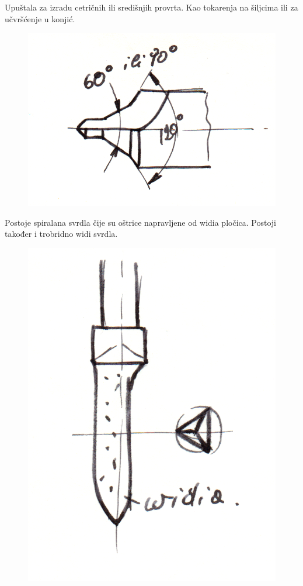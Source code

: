 \documentclass[a4paper,12pt]{article}
\numberwithin{figure}{section}
\begin{document}
Upuštala za izradu cetričnih ili središnjih provrta. Kao tokarenja na šiljcima ili za učvršćenje u konjić.
\begin{figure}[!h]
\centering
\includegraphics[scale=0.13]{image_25-1.png}
\end{figure}
\FloatBarrier
Postoje spiralana svrdla čije su oštrice napravljene od widia pločica. Postoji također i trobridno widi svrdla.
\begin{figure}[!h]
\centering
\includegraphics[scale=0.1]{image_25-2.png}
\end{figure}
\FloatBarrier
\end{document}

